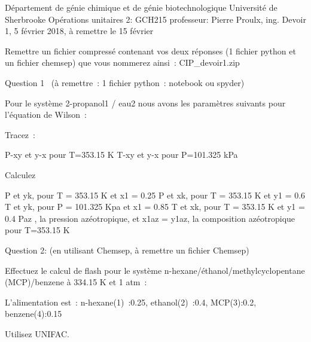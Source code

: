﻿




Département de génie chimique et de génie biotechnologique
Université de Sherbrooke
Opérations unitaires 2: GCH215					professeur: Pierre Proulx, ing.
Devoir 1, 5  février 2018, à remettre le 15 février

Remettre un fichier compressé contenant vos deux réponses (1 fichier python et un fichier chemsep) que vous nommerez  ainsi : CIP_devoir1.zip

Question 1  (à remettre : 1 fichier python : notebook ou spyder)

Pour le système 2-propanol1 / eau2 nous avons les paramètres suivants pour l’équation de Wilson :

		
		

Tracez :

P-xy et y-x pour T=353.15 K
T-xy et y-x pour P=101.325 kPa

Calculez

P et yk, pour T = 353.15 K et x1 = 0.25
P et xk, pour T = 353.15 K et y1 = 0.6
T et yk, pour P = 101.325 Kpa et x1 = 0.85
T et xk, pour T = 353.15 K et y1 = 0.4
Paz , la pression azéotropique, et x1az =  y1az, la composition azéotropique pour T=353.15 K



Question 2: (en utilisant Chemsep, à remettre un fichier Chemsep)

Effectuez le calcul de flash pour le système n-hexane/éthanol/methylcyclopentane (MCP)/benzene à 334.15 K et 1 atm :

L’alimentation est :   n-hexane(1) :0.25, ethanol(2) :0.4, MCP(3):0.2, benzene(4):0.15

Utilisez UNIFAC.



